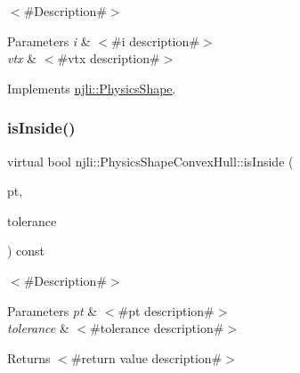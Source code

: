 $<$\#\+Description\#$>$


\begin{DoxyParams}{Parameters}
{\em i} & $<$\#i description\#$>$ \\
\hline
{\em vtx} & $<$\#vtx description\#$>$ \\
\hline
\end{DoxyParams}


Implements \mbox{\hyperlink{classnjli_1_1_physics_shape_acb05a16bdbfa5cee6dcbab5c253eb78e}{njli\+::\+Physics\+Shape}}.

\mbox{\label{classnjli_1_1_physics_shape_convex_hull_aa36afe5a7ad06f0195e3400375a99974}} 
\subsubsection{\texorpdfstring{is\+Inside()}{isInside()}}
{\footnotesize\ttfamily virtual bool njli\+::\+Physics\+Shape\+Convex\+Hull\+::is\+Inside (\begin{DoxyParamCaption}\item[{const bt\+Vector3 \&}]{pt,  }\item[{\mbox{\hyperlink{_util_8h_a5f6906312a689f27d70e9d086649d3fd}{f32}}}]{tolerance }\end{DoxyParamCaption}) const\hspace{0.3cm}{\ttfamily [virtual]}}

$<$\#\+Description\#$>$


\begin{DoxyParams}{Parameters}
{\em pt} & $<$\#pt description\#$>$ \\
\hline
{\em tolerance} & $<$\#tolerance description\#$>$\\
\hline
\end{DoxyParams}
\begin{DoxyReturn}{Returns}
$<$\#return value description\#$>$ 
\end{DoxyReturn}
\mbox{\label{classnjli_1_1_physics_shape_convex_hull_a88aff2dea2118c7a1c0f95c6d0d2ddda}} 
